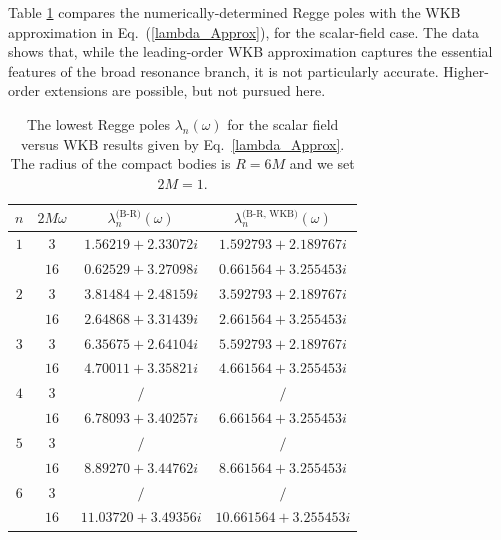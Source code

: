 \documentclass[aps,prd,longbibliography,reprint,twocolumn,amsmath,amssymb,amsfonts,showpacs,superscriptaddress]{revtex4-1}%
\begin{document}
Table \ref{tab:table5} compares the numerically-determined Regge poles with the WKB approximation in Eq.~(\ref{lambda_Approx}),  for the scalar-field case. The data shows that, while the leading-order WKB approximation captures the essential features of the broad resonance branch, it is not particularly accurate. Higher-order extensions are possible, but not pursued here.




\begingroup
\squeezetable
\begin{table}[htp]
\caption{\label{tab:table5} The lowest Regge poles $\lambda_{n}(\omega)$ for the scalar field versus WKB results given by Eq.~\eqref{lambda_Approx}. The radius of the compact bodies is $R = 6M$ and we set $2M=1$.}
\smallskip
\centering
\begin{ruledtabular}
\begin{tabular}{cccc}
 $n$ & $2 M \omega$  & $\lambda^{\text{(B-R)}}_n(\omega)$ & $\lambda^{\text{(B-R, WKB)}}_n(\omega)$
 \\ \hline
$1$  & $3$  & $1.56219+2.33072 i$  & $1.592793+2.189767i$   \\
     & $16$ & $ 0.62529+3.27098 i$ & $0.661564+3.255453i $   \\

$2$  & $3$  & $3.81484+2.48159 i$  & $3.592793+2.189767i $    \\
     & $16$ & $2.64868+3.31439 i$  & $2.661564+3.255453i $    \\

$3$  & $3$  & $6.35675+2.64104 i$ & $5.592793+2.189767i $    \\
     & $16$ & $4.70011+3.35821 i$  & $4.661564+3.255453i $    \\

$4$  & $3$  & $/$  & $ / $   \\
     & $16$ & $6.78093+3.40257 i$  & $6.661564+3.255453i $  \\

$5$  & $3$  & $/$  & $/$     \\
     & $16$ & $8.89270+3.44762 i$  & $8.661564+3.255453i $   \\

$6$  & $3$  & $/$  & $/$    \\
     & $16$ & $11.03720+3.49356 i$ & $10.661564+3.255453i $ \\


\end{tabular}
\end{ruledtabular}
\end{table}
\end{document}
